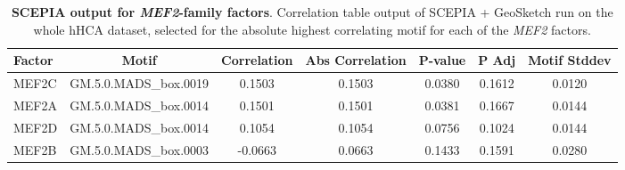 \begin{table}[htbp]
    \centering
    \caption{\textbf{SCEPIA output for \textit{MEF2}-family factors}. Correlation table output of SCEPIA + GeoSketch run on the whole hHCA dataset, selected for the absolute highest correlating motif for each of the \textit{MEF2} factors.}
    \label{tab:corrtable_GeoSCEPIA}
    \begin{tabular}{lcccccc}
        \toprule
        \textbf{Factor} & \textbf{Motif} & \textbf{Correlation} & \textbf{Abs Correlation} & \textbf{P-value} & \textbf{P Adj} & \textbf{Motif Stddev} \\
        \midrule
        MEF2C & GM.5.0.MADS\_box.0019 & 0.1503 & 0.1503 & 0.0380 & 0.1612 & 0.0120 \\
        MEF2A & GM.5.0.MADS\_box.0014 & 0.1501 & 0.1501 & 0.0381 & 0.1667 & 0.0144 \\
        MEF2D & GM.5.0.MADS\_box.0014 & 0.1054 & 0.1054 & 0.0756 & 0.1024 & 0.0144 \\
        MEF2B & GM.5.0.MADS\_box.0003 & -0.0663 & 0.0663 & 0.1433 & 0.1591 & 0.0280 \\
        \bottomrule
    \end{tabular}
\end{table}

